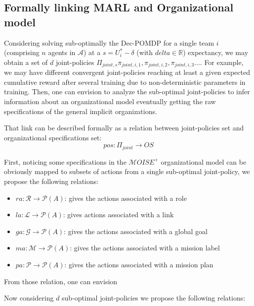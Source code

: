 \documentclass[runningheads]{llncs}
\begin{document}
\subsection{Formally linking MARL and Organizational model}

Considering solving sub-optimally the Dec-POMDP for a single team $i$ (comprising $n$ agents in $\mathcal{A}$) at a $s = U_i^* - \delta$ (with $delta \in \mathbb{R}$) expectancy, we may obtain a set of $d$ joint-policies $\Pi_{joint,s}{\pi_{joint,i,1}, \pi_{joint,i,2}, \pi_{joint,i,3}...}$. For example, we may have different convergent joint-policies reaching at least a given expected cumulative reward after several training due to non-deterministic parameters in training. Then, one can envision to analyze the sub-optimal joint-policies to infer information about an organizational model eventually getting the raw specifications of the general implicit organizations.

That link can be described formally as a relation between joint-policies set and organizational specifications set:
\begin{equation}
    pos: \Pi_{joint} \rightarrow OS
\end{equation}


First, noticing some specifications in the $\mathcal{M}OISE^+$ organizational model can be obviously mapped to subsets of actions from a single sub-optimal joint-policy, we propose the following relations:

\begin{itemize}
    \item $ra: \mathcal{R} \rightarrow \mathcal{P}(A)$: gives the actions associated with a role
    \item $la: \mathcal{L} \rightarrow \mathcal{P}(A)$: gives actions associated with a link
    \item $ga: \mathcal{G} \rightarrow \mathcal{P}(A)$: gives the actions associated with a global goal
    \item $ma: \mathcal{M} \rightarrow \mathcal{P}(A)$: gives the actions associated with a mission label
    \item $pa: \mathcal{P} \rightarrow \mathcal{P}(A)$: gives the actions associated with a mission plan
\end{itemize}

From those relation, one can envision

Now considering $d$ sub-optimal joint-policies we propose the following relations:
\end{document}
